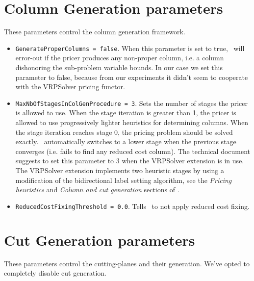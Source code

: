 \section{Column Generation parameters}

These parameters control the column generation framework.

\begin{itemize}
	\item \texttt{GenerateProperColumns = false}.
	      When this parameter is set to true, \bapcod\ will error-out if the pricer produces any non-proper column,
	      i.e. a column dishonoring the sub-problem variable bounds.
	      In our case we set this parameter to false,
	      because from our experiments it didn't seem to cooperate with the VRPSolver pricing functor.
	\item \texttt{MaxNbOfStagesInColGenProcedure = 3}.
	      Sets the number of stages the pricer is allowed to use.
	      When the stage iteration is greater than 1, the pricer is allowed to use
	      progressively lighter heuristics for determining columns.
	      When the stage iteration reaches stage 0, the pricing problem should be solved exactly.
	      \bapcod\ automatically switches to a lower stage when the previous stage converges (i.e. fails to find any reduced cost column).
	      The technical document suggests to set this parameter to $3$ when the VRPSolver extension is in use.
	      The VRPSolver extension implements two heuristic stages by using a modification of the bidirectional label setting algorithm,
	      see the \textit{Pricing heuristics} and \textit{Column and cut generation} sections of \textcite{sadykov2021a}.
	\item \texttt{ReducedCostFixingThreshold = 0.0}.
	      Tells \bapcod\ to not apply reduced cost fixing.
\end{itemize}

\section{Cut Generation parameters}
These parameters control the cutting-planes and their generation.
We've opted to completely disable cut generation.

